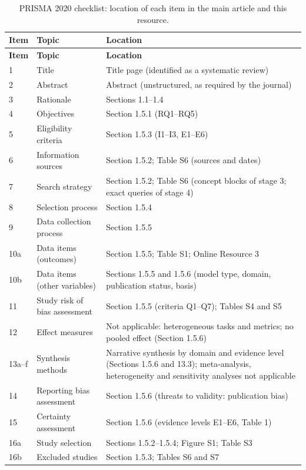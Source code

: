 \documentclass[10pt,a4paper]{article}
\begin{document}
\begin{longtable}{@{}P{1.2cm}P{4.6cm}P{10.6cm}@{}}
\caption{PRISMA 2020 checklist: location of each item in the main article and this resource.}\label{tab:S2}\\
\toprule \textbf{Item} & \textbf{Topic} & \textbf{Location} \\ \midrule \endfirsthead
\toprule \textbf{Item} & \textbf{Topic} & \textbf{Location} \\ \midrule \endhead
\bottomrule \endfoot

1 & Title & Title page (identified as a systematic review) \\
2 & Abstract & Abstract (unstructured, as required by the journal) \\
3 & Rationale & Sections 1.1--1.4 \\
4 & Objectives & Section 1.5.1 (RQ1--RQ5) \\
5 & Eligibility criteria & Section 1.5.3 (I1--I3, E1--E6) \\
6 & Information sources & Section 1.5.2; Table S6 (sources and dates) \\
7 & Search strategy & Section 1.5.2; Table S6 (concept blocks of stage 3; exact queries of stage 4) \\
8 & Selection process & Section 1.5.4 \\
9 & Data collection process & Section 1.5.5 \\
10a & Data items (outcomes) & Section 1.5.5; Table S1; Online Resource 3 \\
10b & Data items (other variables) & Sections 1.5.5 and 1.5.6 (model type, domain, publication status, basis) \\
11 & Study risk of bias assessment & Section 1.5.5 (criteria Q1--Q7); Tables S4 and S5 \\
12 & Effect measures & Not applicable: heterogeneous tasks and metrics; no pooled effect (Section 1.5.6) \\
13a--f & Synthesis methods & Narrative synthesis by domain and evidence level (Sections 1.5.6 and 13.3); meta-analysis, heterogeneity and sensitivity analyses not applicable \\
14 & Reporting bias assessment & Section 1.5.6 (threats to validity: publication bias) \\
15 & Certainty assessment & Section 1.5.6 (evidence levels E1--E6, Table 1) \\
16a & Study selection & Sections 1.5.2--1.5.4; Figure S1; Table S3 \\
16b & Excluded studies & Section 1.5.3; Tables S6 and S7 \\

\end{longtable}
\end{document}
